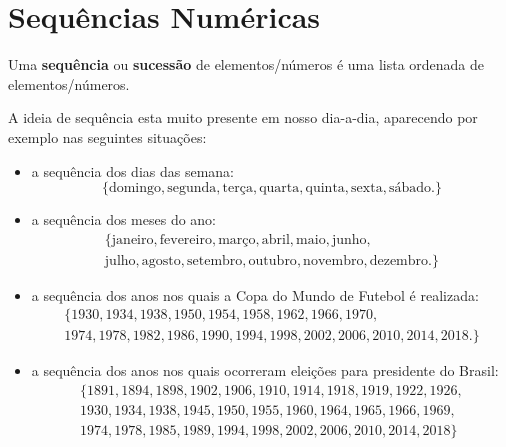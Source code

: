 \chapter{Sequências Numéricas}


\colorbox{azul}{
 \begin{minipage}{14.5cm}
 \begin{center}
  Uma \textbf{sequência} ou \textbf{sucessão} de elementos/números é uma lista ordenada de elementos/números.
 \end{center}
 \end{minipage}}
 \vskip0.3cm


A ideia de sequência esta muito presente em nosso dia-a-dia, aparecendo por exemplo nas seguintes situações:
\begin{exem}
 \begin{itemize}
  Exemplos de sequências:
  \item a sequência dos dias das semana:\\
\[
\{\text{domingo}, \text{segunda}, \text{terça}, \text{quarta}, \text{quinta}, \text{sexta}, \text{sábado}.\}
\]
  \item a sequência dos meses do ano: \\
\begin{multline*}
\{\text{janeiro}, \text{fevereiro}, \text{março}, \text{abril}, \text{maio}, \text{junho}, \\
\text{julho}, \text{agosto}, \text{setembro}, \text{outubro}, \text{novembro}, \text{dezembro}.\}
\end{multline*}
  \item a sequência dos anos nos quais a Copa do Mundo de Futebol é realizada: \\
\begin{multline*}
\{1930, 1934, 1938, 1950, 1954, 1958, 1962, 1966, 1970, \\
1974, 1978, 1982, 1986, 1990, 1994, 1998, 2002, 2006, 2010, 2014, 2018.\}
\end{multline*}
  \item a sequência dos anos nos quais ocorreram eleições para presidente do Brasil: \\
\begin{multline*}
\{1891, 1894, 1898, 1902, 1906, 1910, 1914, 1918, 1919, 1922, 1926,\\ 1930, 1934, 1938, 1945, 1950, 1955, 1960, 1964, 1965, 1966, 1969,\\ 1974, 1978, 1985, 1989, 1994, 1998, 2002, 2006, 2010, 2014, 2018\}

\end{multline*}
\end{itemize}
\end{exem}
